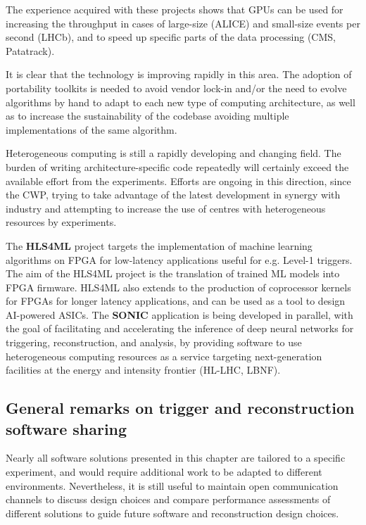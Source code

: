 The experience acquired with these projects shows that GPUs can be used
for increasing the throughput in cases of large-size (ALICE) \cite{david_rohr_2019_3599418} and small-size events per second (LHCb), and to speed up
specific parts of the data processing (CMS, Patatrack).

It is clear that the technology is improving rapidly in this area. The
adoption of portability toolkits is needed to avoid vendor lock-in
and/or the need to evolve algorithms by hand to adapt to each new type
of computing architecture, as well as to increase the sustainability of
the codebase avoiding multiple implementations of the same algorithm.

Heterogeneous computing is still a rapidly developing and changing
field. The burden of writing architecture-specific code repeatedly will
certainly exceed the available effort from the experiments. Efforts are
ongoing in this direction, since the CWP, trying to take advantage of
the latest development in synergy with industry and attempting to
increase the use of centres with heterogeneous resources by experiments.

The \textbf{HLS4ML} project \cite{Duarte:2018ite,Summers:2020xiy,DiGuglielmo:2020eqx} targets the implementation of
machine learning algorithms on FPGA for low-latency applications useful
for e.g. Level-1 triggers. The aim of the HLS4ML project is the
translation of trained ML models into FPGA firmware. HLS4ML also extends
to the production of coprocessor kernels for FPGAs for longer latency
applications, and can be used as a tool to design AI-powered ASICs. The
\textbf{SONIC} application \cite{Duarte:2019fta} is being developed in parallel, with
the goal of facilitating and accelerating the inference of deep neural
networks for triggering, reconstruction, and analysis, by providing
software to use heterogeneous computing resources as a service targeting
next-generation facilities at the energy and intensity frontier (HL-LHC,
LBNF).

\hypertarget{general-remarks-on-trigger-and-reconstruction-software-sharing}{%
\subsection{General remarks on trigger and reconstruction software
sharing}\label{general-remarks-on-trigger-and-reconstruction-software-sharing}}

Nearly all software solutions presented in this chapter are tailored to
a specific experiment, and would require additional work to be adapted
to different environments. Nevertheless, it is still useful to maintain
open communication channels to discuss design choices and compare
performance assessments of different solutions to guide future software
and reconstruction design choices.

